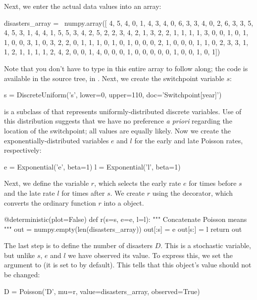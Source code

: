 \documentclass[]{jss}
\begin{document}
Next, we enter the actual data values into an array:
\begin{CodeInput}
disasters_array =   \
     numpy.array([ 4, 5, 4, 0, 1, 4, 3, 4, 0, 6, 3, 3, 4, 0, 2, 6,
                   3, 3, 5, 4, 5, 3, 1, 4, 4, 1, 5, 5, 3, 4, 2, 5,
                   2, 2, 3, 4, 2, 1, 3, 2, 2, 1, 1, 1, 1, 3, 0, 0,
                   1, 0, 1, 1, 0, 0, 3, 1, 0, 3, 2, 2, 0, 1, 1, 1,
                   0, 1, 0, 1, 0, 0, 0, 2, 1, 0, 0, 0, 1, 1, 0, 2,
                   3, 3, 1, 1, 2, 1, 1, 1, 1, 2, 4, 2, 0, 0, 1, 4,
                   0, 0, 0, 1, 0, 0, 0, 0, 0, 1, 0, 0, 1, 0, 1])
\end{CodeInput}
Note that you don't have to type in this entire array to follow along; the code is available in the source tree, in .  Next, we create the switchpoint variable $s$:
\begin{CodeInput}
s = DiscreteUniform('s', lower=0, upper=110, doc='Switchpoint[year]')
\end{CodeInput}
 is a subclass of  that represents uniformly-distributed discrete variables. Use of this distribution suggests that we have no preference \emph{a priori} regarding the location of the switchpoint; all values are equally likely. Now we create the exponentially-distributed variables $e$ and $l$ for the early and late Poisson rates, respectively:
\begin{CodeInput}
e = Exponential('e', beta=1)
l = Exponential('l', beta=1)
\end{CodeInput}
Next, we define the variable $r$, which selects the early rate $e$ for times before $s$ and the late rate $l$ for times after $s$. We create $r$ using the  decorator, which converts the ordinary  function $r$ into a  object.
\begin{CodeInput}
@deterministic(plot=False)
def r(s=s, e=e, l=l):
  """ Concatenate Poisson means """
    out = numpy.empty(len(disasters_array))
    out[:s] = e
    out[s:] = l
    return out
\end{CodeInput}
The last step is to define the number of disasters $D$. This is a stochastic variable, but unlike $s$, $e$ and $l$ we have observed its value. To express this, we set the argument  to  (it is set to  by default). This tells  that this object's value should not be changed:
\begin{CodeInput}
D = Poisson('D', mu=r, value=disasters_array, observed=True)
\end{CodeInput}
\end{document}
